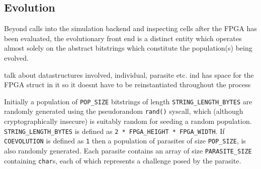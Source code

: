 \subsection{Evolution}
Beyond calls into the simulation backend and inspecting cells after the FPGA
has been evaluated, the evolutionary front end is a distinct entity which operates
almost solely on the abstract bitstrings which constitute the population(s)
being evolved.

\todo talk about datastructures involved, individual, parasite etc. ind has space
for the FPGA struct in it so it doesnt have to be reinstantiated throughout the
process

Initially a population of \texttt{POP\_SIZE} bitstrings of length \texttt{STRING\_LENGTH\_BYTES}
are randomly generated using the pseudorandom \texttt{rand()} syscall, which
(although cryptographically insecure) is suitably random for seeding a random
population. \texttt{STRING\_LENGTH\_BYTES} is defined as \texttt{2 * FPGA\_HEIGHT * FPGA\_WIDTH}.
If \texttt{COEVOLUTION} is defined as \texttt{1} then a population of
parasites of size \texttt{POP\_SIZE}, is also randomly generated. Each parasite
contains an array of size \texttt{PARASITE\_SIZE} containing \texttt{char}s, each of which represents a
challenge posed by the parasite.

